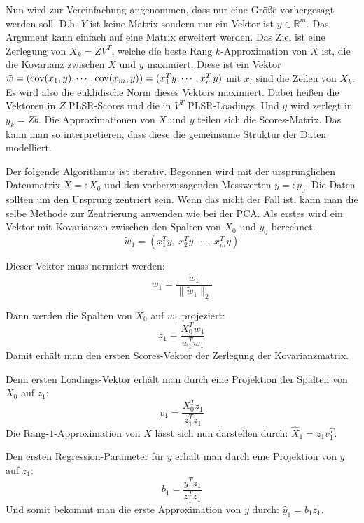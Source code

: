 \documentclass{article}
\newcommand{\R}[0]{\mathbb{R}}
\theoremstyle{plain}
\theoremstyle{definition}
\begin{document}
Nun wird zur Vereinfachung angenommen, dass nur eine Größe vorhergesagt werden soll.
D.h. $Y$ ist keine Matrix sondern nur ein Vektor ist $y \in \R^m$. Das Argument kann einfach auf eine Matrix erweitert werden.
Das Ziel ist eine Zerlegung von $X_k = ZV^T$, welche die beste Rang $k$-Approximation von $X$ ist, die die Kovarianz zwischen $X$ und $y$ maximiert.
Diese ist ein Vektor $\tilde{w} = ({\rm cov}(x_1,y), \cdots, {\rm cov}(x_m,y)) = (x_1^Ty, \cdots, x_m^Ty)$ mit $x_i$ sind die Zeilen von $X_k$. Es wird also die euklidische Norm dieses Vektors maximiert.
Dabei heißen die Vektoren in $Z$ PLSR-Scores und die in $V^T$ PLSR-Loadings. Und $y$ wird zerlegt in $y_k = Zb$. 
Die Approximationen von $X$ und $y$ teilen sich die Scores-Matrix. Das kann man so interpretieren, dass diese die gemeinsame Struktur der Daten modelliert.

Der folgende Algorithmus ist iterativ. Begonnen wird mit der ursprünglichen Datenmatrix $X=:X_0$ und den vorherzusagenden Messwerten $y=:y_0$.
Die Daten sollten um den Ursprung zentriert sein. Wenn das nicht der Fall ist, kann man die selbe Methode zur Zentrierung anwenden wie bei der PCA.
Als erstes wird ein Vektor mit Kovarianzen zwischen den Spalten von $X_0$ und $y_0$ berechnet.
\begin{equation*}
    \tilde{w}_1 = (x_1^Ty, \: x_2^Ty, \: \cdots, \: x_m^Ty)
\end{equation*}

Dieser Vektor muss normiert werden:
\begin{equation*}
    w_1 = \frac{\tilde{w}_1}{\lVert \tilde{w}_1 \rVert_2}
\end{equation*}

Dann werden die Spalten von $X_0$ auf $w_1$ projeziert:
\begin{equation*}
    z_1 = \frac{X_0^Tw_1}{w_1^Tw_1}
\end{equation*}
Damit erhält man den ersten Scores-Vektor der Zerlegung der Kovarianzmatrix. 

Denn ersten Loadings-Vektor erhält man durch eine Projektion der Spalten von $X_0$ auf $z_1$:
\begin{equation*}
    v_1 = \frac{X_0^Tz_1}{z_1^Tz_1}
\end{equation*}
Die Rang-$1$-Approximation von $X$ lässt sich nun darstellen durch: $\hat{X}_1 = z_1v_1^T$.

Den ersten Regression-Parameter für $y$ erhält man durch eine Projektion von $y$ auf $z_1$:
\begin{equation*}
    b_1 = \frac{y^Tz_1}{z_1^Tz_1}
\end{equation*}
Und somit bekommt man die erste Approximation von $y$ durch: $\hat{y}_1 = b_1z_1$.
\end{document}
